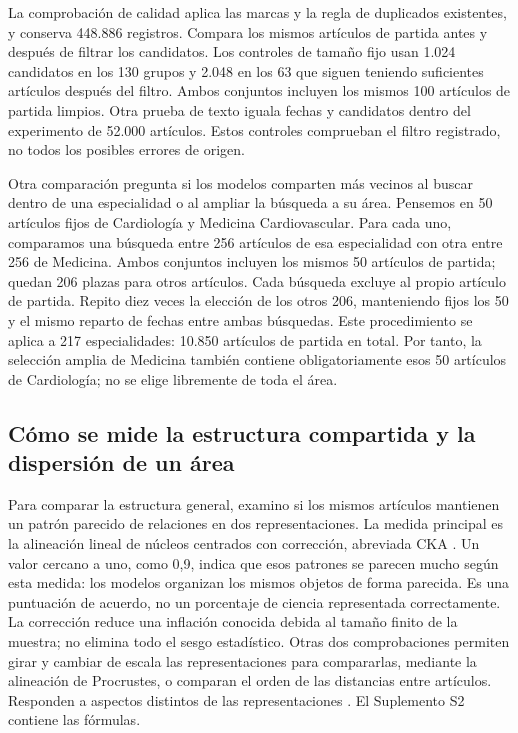 \documentclass[12pt]{article}
\begin{document}
La comprobación de calidad aplica las marcas y la regla de duplicados existentes, y conserva 448.886 registros. Compara los mismos artículos de partida antes y después de filtrar los candidatos. Los controles de tamaño fijo usan 1.024 candidatos en los 130 grupos y 2.048 en los 63 que siguen teniendo suficientes artículos después del filtro. Ambos conjuntos incluyen los mismos 100 artículos de partida limpios. Otra prueba de texto iguala fechas y candidatos dentro del experimento de 52.000 artículos. Estos controles comprueban el filtro registrado, no todos los posibles errores de origen.

Otra comparación pregunta si los modelos comparten más vecinos al buscar dentro de una especialidad o al ampliar la búsqueda a su área. Pensemos en 50 artículos fijos de Cardiología y Medicina Cardiovascular. Para cada uno, comparamos una búsqueda entre 256 artículos de esa especialidad con otra entre 256 de Medicina. Ambos conjuntos incluyen los mismos 50 artículos de partida; quedan 206 plazas para otros artículos. Cada búsqueda excluye al propio artículo de partida. Repito diez veces la elección de los otros 206, manteniendo fijos los 50 y el mismo reparto de fechas entre ambas búsquedas. Este procedimiento se aplica a 217 especialidades: 10.850 artículos de partida en total. Por tanto, la selección amplia de Medicina también contiene obligatoriamente esos 50 artículos de Cardiología; no se elige libremente de toda el área.

\subsection{Cómo se mide la estructura compartida y la dispersión de un área}
Para comparar la estructura general, examino si los mismos artículos mantienen un patrón parecido de relaciones en dos representaciones. La medida principal es la alineación lineal de núcleos centrados con corrección, abreviada CKA \citep{pmlr-v97-kornblith19a,refa961d84a4e}. Un valor cercano a uno, como 0,9, indica que esos patrones se parecen mucho según esta medida: los modelos organizan los mismos objetos de forma parecida. Es una puntuación de acuerdo, no un porcentaje de ciencia representada correctamente. La corrección reduce una inflación conocida debida al tamaño finito de la muestra; no elimina todo el sesgo estadístico. Otras dos comprobaciones permiten girar y cambiar de escala las representaciones para compararlas, mediante la alineación de Procrustes, o comparan el orden de las distancias entre artículos. Responden a aspectos distintos de las representaciones \citep{NEURIPS2021_252a3dba,pmlr-v285-williams24a}. El Suplemento S2 contiene las fórmulas.
\end{document}
